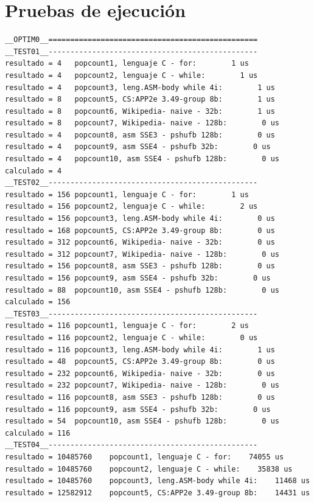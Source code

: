 	\section[Pruebas de ejecución]{Pruebas de ejecución}

	\lstset{language=C}
	\begin{lstlisting}[frame=single]  
__OPTIM0__================================================ 
__TEST01__------------------------------------------------
resultado = 4	popcount1, lenguaje C - for:        1 us
resultado = 4	popcount2, lenguaje C - while:        1 us
resultado = 4	popcount3, leng.ASM-body while 4i:        1 us
resultado = 8	popcount5, CS:APP2e 3.49-group 8b:        1 us
resultado = 8	popcount6, Wikipedia- naive - 32b:        1 us
resultado = 8	popcount7, Wikipedia- naive - 128b:        0 us 
resultado = 4	popcount8, asm SSE3 - pshufb 128b:        0 us
resultado = 4	popcount9, asm SSE4 - pshufb 32b:        0 us
resultado = 4	popcount10, asm SSE4 - pshufb 128b:        0 us
calculado = 4
__TEST02__------------------------------------------------
resultado = 156	popcount1, lenguaje C - for:        1 us
resultado = 156	popcount2, lenguaje C - while:        2 us
resultado = 156	popcount3, leng.ASM-body while 4i:        0 us
resultado = 168	popcount5, CS:APP2e 3.49-group 8b:        0 us
resultado = 312	popcount6, Wikipedia- naive - 32b:        0 us
resultado = 312	popcount7, Wikipedia- naive - 128b:        0 us
resultado = 156	popcount8, asm SSE3 - pshufb 128b:        0 us
resultado = 156	popcount9, asm SSE4 - pshufb 32b:        0 us
resultado = 88	popcount10, asm SSE4 - pshufb 128b:        0 us
calculado = 156
__TEST03__------------------------------------------------
resultado = 116	popcount1, lenguaje C - for:        2 us
resultado = 116	popcount2, lenguaje C - while:        0 us
resultado = 116	popcount3, leng.ASM-body while 4i:        1 us
resultado = 48	popcount5, CS:APP2e 3.49-group 8b:        0 us
resultado = 232	popcount6, Wikipedia- naive - 32b:        0 us
resultado = 232	popcount7, Wikipedia- naive - 128b:        0 us
resultado = 116	popcount8, asm SSE3 - pshufb 128b:        0 us
resultado = 116	popcount9, asm SSE4 - pshufb 32b:        0 us
resultado = 54	popcount10, asm SSE4 - pshufb 128b:        0 us
calculado = 116
__TEST04__------------------------------------------------
resultado = 10485760	popcount1, lenguaje C - for:    74055 us
resultado = 10485760	popcount2, lenguaje C - while:    35838 us
resultado = 10485760	popcount3, leng.ASM-body while 4i:    11468 us
resultado = 12582912	popcount5, CS:APP2e 3.49-group 8b:    14431 us

\end{lstlisting}
